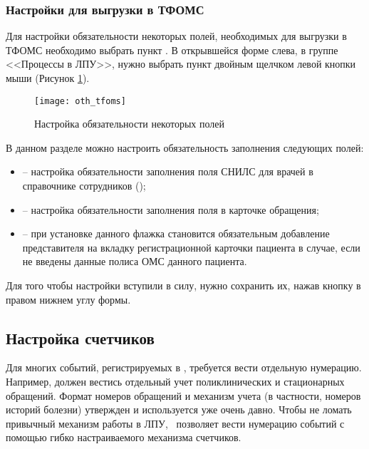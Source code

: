 \subsubsection{Настройки для выгрузки в ТФОМС}

Для настройки обязательности некоторых полей, необходимых для выгрузки в ТФОМС необходимо выбрать пункт . В открывшейся форме слева, в группе <<Процессы в ЛПУ>>, нужно выбрать пункт  двойным щелчком левой кнопки мыши (Рисунок \ref{img_oth_tfoms}).

\begin{figure}[ht]\centering
 \texttt{[image: oth\_tfoms]}
 \caption{Настройка обязательности некоторых полей}
 \label{img_oth_tfoms}
\end{figure}

В данном разделе можно настроить обязательность заполнения следующих полей:
\begin{itemize}
 \item {} -- настройка обязательности заполнения поля СНИЛС для врачей в справочнике сотрудников ();
 \item {} -- настройка обязательности заполнения поля   в карточке обращения;
 \item {} -- при установке данного флажка становится обязательным добавление представителя на вкладку  регистрационной карточки пациента в случае, если не введены данные полиса ОМС данного пациента.
\end{itemize}

Для того чтобы настройки вступили в силу, нужно сохранить их, нажав кнопку   в правом нижнем углу формы. 

\subsection{Настройка счетчиков}

Для многих событий, регистрируемых в \tmis, требуется вести отдельную нумерацию. Например, должен вестись отдельный учет поликлинических и стационарных обращений. Формат номеров обращений и механизм учета (в частности, номеров историй болезни) утвержден и используется уже очень давно. Чтобы не ломать привычный механизм работы в ЛПУ, \tmis~позволяет вести нумерацию событий с помощью гибко настраиваемого механизма счетчиков.

